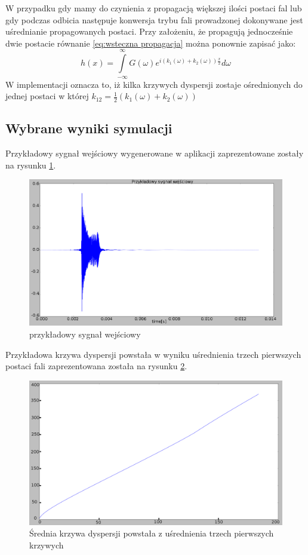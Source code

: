 W przypadku gdy mamy do czynienia z propagacją większej ilości postaci fal lub gdy podczas odbicia następuje konwersja trybu fali prowadzonej dokonywane jest uśrednianie propagowanych postaci. Przy założeniu, że propagują jednocześnie dwie postacie równanie \ref{eq:wsteczna propagacja} można ponownie zapisać jako:
\begin{equation}
h(x) = \int\limits _{-\infty}^{\infty}G(\omega)e^{i(k_1(\omega)+k_2(\omega))\frac{x}{2}}d\omega \label{eq:wiele postaci}
\end{equation}
W implementacji oznacza to, iż kilka krzywych dyspersji zostaje ośrednionych do jednej postaci w której $k_{12} = \frac{1}{2}(k_1(\omega) + k_2(\omega))$
\subsection{Wybrane wyniki symulacji}
Przykładowy sygnał wejściowy wygenerowane w aplikacji zaprezentowane zostały na rysunku \ref{fig:przykl_we}.
\begin{figure}[h]
\centering
\includegraphics[width=14cm]{Zdjecia/4/przykl_we}
\caption{przykładowy sygnał wejściowy}
\label{fig:przykl_we}
\end{figure}
Przykładowa krzywa dyspersji powstała w wyniku uśrednienia trzech pierwszych postaci fali zaprezentowana została na rysunku \ref{fig:mean}. 
\begin{figure}[h]
\centering
\includegraphics[width=14cm]{Zdjecia/4/meanmode}
\caption{Średnia krzywa dyspersji powstała z uśrednienia trzech pierwszych krzywych}
\label{fig:mean}
\end{figure}

